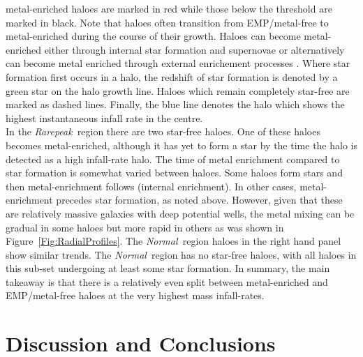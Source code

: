 \documentclass[graphics, twocolumn, usenatbib]{mn2e}
\newcommand{\rarepeak} {\textit{Rarepeak~}}
\newcommand{\normal} {\textit{Normal~}}
\begin{document}
metal-enriched haloes are marked in red while those below the threshold are marked in black. Note
that haloes often transition from EMP/metal-free to metal-enriched during the course of their growth. 
Haloes can become metal-enriched either through internal star formation and
supernovae or alternatively can become metal enriched through external enrichement processes
\citep[e.g.,][]{Smith_2015}. Where star formation first
occurs in a halo, the redshift of star formation is denoted by a green star on the halo growth line. 
Haloes which remain completely star-free are marked as dashed lines. Finally, the blue line denotes
the halo which shows the highest instantaneous infall rate in the centre. \\
\indent In the \rarepeak region there are two
star-free haloes. One of these haloes becomes metal-enriched, although it has yet to form
a star by the time the halo is detected as a high infall-rate halo. The time of metal enrichment
compared to star formation is somewhat varied between haloes. Some haloes form stars and then
metal-enrichment follows (internal enrichment). In other cases, metal-enrichment precedes
star formation, as noted above.
However, given that these are relatively massive galaxies with deep potential wells,
the metal mixing can be gradual in some haloes but more rapid in others as was shown in Figure~\ref{Fig:RadialProfiles}. The \normal region haloes in the right hand panel show similar trends.
The \normal region has no star-free haloes, with all haloes in this sub-set undergoing at
least some star formation. In summary, the main takeaway is that there is a relatively even split
between metal-enriched and EMP/metal-free haloes at the very highest mass infall-rates. 

\section{Discussion and Conclusions} \label{Sec:Discussion}
\end{document}

